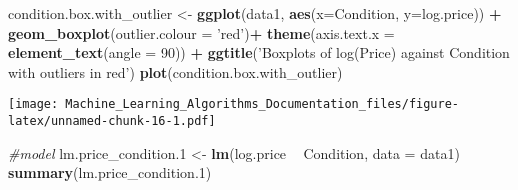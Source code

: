 \documentclass[
]{article}
\newenvironment{Shaded}{\begin{snugshade}}{\end{snugshade}}
\newcommand{\CommentTok}[1]{\textcolor[rgb]{0.56,0.35,0.01}{\textit{#1}}}
\newcommand{\DataTypeTok}[1]{\textcolor[rgb]{0.13,0.29,0.53}{#1}}
\newcommand{\DecValTok}[1]{\textcolor[rgb]{0.00,0.00,0.81}{#1}}
\newcommand{\FloatTok}[1]{\textcolor[rgb]{0.00,0.00,0.81}{#1}}
\newcommand{\KeywordTok}[1]{\textcolor[rgb]{0.13,0.29,0.53}{\textbf{#1}}}
\newcommand{\NormalTok}[1]{#1}
\newcommand{\OperatorTok}[1]{\textcolor[rgb]{0.81,0.36,0.00}{\textbf{#1}}}
\newcommand{\StringTok}[1]{\textcolor[rgb]{0.31,0.60,0.02}{#1}}
\begin{document}
\begin{Shaded}
\begin{Highlighting}[]
\NormalTok{condition.box.with_outlier <-}\StringTok{ }\KeywordTok{ggplot}\NormalTok{(data1, }\KeywordTok{aes}\NormalTok{(}\DataTypeTok{x=}\NormalTok{Condition, }\DataTypeTok{y=}\NormalTok{log.price)) }\OperatorTok{+}\StringTok{ }\KeywordTok{geom_boxplot}\NormalTok{(}\DataTypeTok{outlier.colour =} \StringTok{'red'}\NormalTok{)}\OperatorTok{+}\StringTok{ }\KeywordTok{theme}\NormalTok{(}\DataTypeTok{axis.text.x =} \KeywordTok{element_text}\NormalTok{(}\DataTypeTok{angle =} \DecValTok{90}\NormalTok{)) }\OperatorTok{+}\StringTok{ }\KeywordTok{ggtitle}\NormalTok{(}\StringTok{'Boxplots of log(Price) against Condition with outliers in red'}\NormalTok{)}
\KeywordTok{plot}\NormalTok{(condition.box.with_outlier)}
\end{Highlighting}
\end{Shaded}

\texttt{[image: Machine\_Learning\_Algorithms\_Documentation\_files/figure-latex/unnamed-chunk-16-1.pdf]}

\begin{Shaded}
\begin{Highlighting}[]
\CommentTok{#model}
\NormalTok{lm.price_condition}\FloatTok{.1}\NormalTok{ <-}\StringTok{ }\KeywordTok{lm}\NormalTok{(log.price }\OperatorTok{~}\StringTok{ }\NormalTok{Condition, }\DataTypeTok{data =}\NormalTok{ data1)}
\KeywordTok{summary}\NormalTok{(lm.price_condition}\FloatTok{.1}\NormalTok{)}
\end{Highlighting}
\end{Shaded}
\end{document}
